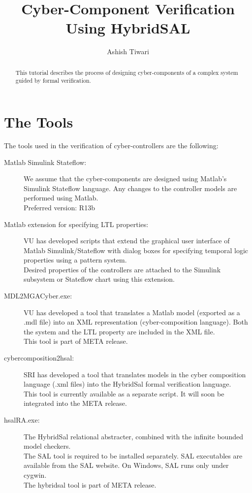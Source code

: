 \documentclass{llncs}
\title{Cyber-Component Verification Using HybridSAL}
\author{Ashish Tiwari}
\institute{SRI International, Menlo Park, CA.\ \url{ashish.tiwari@sri.com}}
\begin{document}
\maketitle

\begin{abstract}
  This tutorial describes the process of
  designing cyber-components of a complex
  system guided by formal verification.
\end{abstract}

\def\XX{\mathbb{X}}
\def\QQ{\mathbb{Q}}
\def\YY{\mathbb{Y}}
\def\RR{\mathbb{R}}
\def\ra{\rightarrow}
\def\bra{{\stackrel{a}{\ra}}}  %
\def\rra{{\stackrel{c}{\ra}}}  %

\section{The Tools}

The tools used in the verification of cyber-controllers
are the following:

\begin{description}
  \item[Matlab Simulink Stateflow:]
    We assume that the cyber-components are 
    designed using Matlab's Simulink Stateflow language.
    Any changes to the controller models are 
    performed using Matlab.
    \\
    Preferred version: R13b
  \item[Matlab extension for specifying LTL properties:]
    VU has developed scripts that 
    extend the graphical user interface
    of Matlab Simulink/Stateflow with dialog boxes 
    for specifying temporal logic properties using a pattern system.
    \\
    Desired properties of the controllers are
    attached to the Simulink subsystem or Stateflow chart
    using this extension.
  \item[MDL2MGACyber.exe:]
    VU has developed a tool that translates a Matlab model
    (exported as a .mdl file) into an XML representation
    (cyber-composition language).
    Both the system and the LTL property are 
    included in the XML file.
    \\
    This tool is part of META release.
  \item[cybercomposition2hsal:]
    SRI has developed a tool that translates models in
    the cyber composition language (.xml files) into
    the HybridSal formal verification language.
    \\
    This tool is currently available as a separate
    script. It will soon be integrated into the META release.
  \item[hsalRA.exe:]
    The HybridSal relational abstracter, combined with
    the infinite bounded model checkers.
    \\
    The SAL tool is required to be installed separately.
    SAL executables are available from the SAL website.
    On Windows, SAL runs only under cygwin.
    \\
    The hybridsal tool is part of META release.
\end{description}
\end{document}
